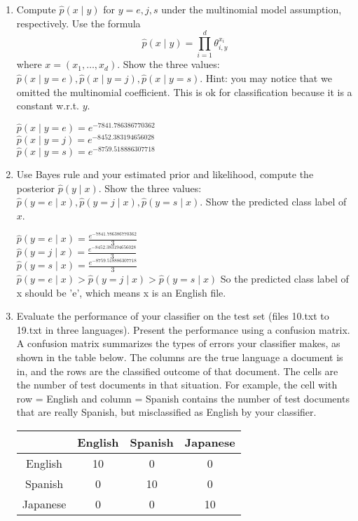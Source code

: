 \documentclass[a4paper]{article}
\theoremstyle{definition}
\newenvironment{soln}{
    \leavevmode\color{blue}\ignorespaces
}{}
\begin{document}
\begin{enumerate}
\item
Compute $\hat p(x \mid y)$ for $y=e, j, s$ under the multinomial model assumption, respectively.
Use the formula
$$\hat p(x \mid y) = \prod_{i=1}^d \theta_{i, y}^{x_i}$$
where $x=(x_1, \ldots, x_d)$.
Show the three values: $\hat p(x \mid y=e), \hat p(x \mid y=j), \hat p(x \mid y=s)$.
Hint: you may notice that we omitted the multinomial coefficient.  This is ok for classification because it is a constant w.r.t. $y$.

\begin{soln}
$\hat p(x \mid y=e) =  e^ {-7841.786386770362}$\\
$\hat p(x \mid y=j) =  e^{-8452.383194656028}$\\
$\hat p(x \mid y=s) = e^{-8759.518886307718}$\\
\end{soln}

\item
Use Bayes rule and your estimated prior and likelihood, compute the posterior $\hat p(y \mid x)$.
Show the three values: $\hat p(y=e \mid x), \hat p(y=j \mid x), \hat p(y=s \mid x)$.
Show the predicted class label of $x$.

\begin{soln}
$\hat p(y=e \mid x) = \frac{e^ {-7841.786386770362}}{3}$\\
$\hat p(y=j \mid x) = \frac{e^{-8452.383194656028}}{3}$\\
$\hat p(y=s \mid x) = \frac{e^{-8759.518886307718}}{3}$\\

$\hat p(y=e \mid x) > \hat p(y=j \mid x) > \hat p(y=s \mid x)$
So the predicted class label of x should be 'e', which means x is an English file.
\end{soln}

\item
Evaluate the performance of your classifier on the test set (files 10.txt to 19.txt in three languages).
Present the performance using a confusion matrix. A confusion matrix summarizes the types of errors your classifier makes, as shown in the table below.   The columns are the true language a document is in, and the rows are the classified outcome of that document.  The cells are the number of test documents in that situation.  For example, the cell with row = English and column = Spanish contains the number of test documents that are really Spanish, but misclassified as English by your classifier.

\begin{center}
\begin{tabular}{c|ccc}
& English & Spanish & Japanese \\
\hline
English& 10 &0 &0 \\  
Spanish& 0& 10 &0\\ 
Japanese& 0& 0 & 10
\end{tabular}
\end{center}


\end{enumerate}
\end{document}
